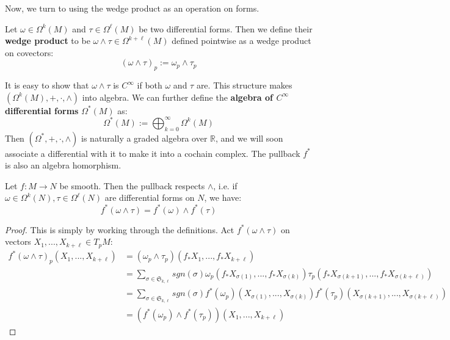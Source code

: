 Now, we turn to using the wedge product as an operation on forms. 
\begin{definition}
	Let $\omega\in\Omega^k(M)$ and $\tau\in\Omega^\ell(M)$ be two differential forms. Then we define their \textbf{wedge 
	product} to be $\omega\wedge\tau\in\Omega^{k + \ell}(M)$ defined pointwise as a wedge product on covectors:
	\begin{equation}
		(\omega\wedge\tau)_p :=\omega_p\wedge\tau_p
	\end{equation}
\end{definition}
It is easy to show that $\omega\wedge\tau$ is $C^\infty$ if both $\omega$ and $\tau$ are. This structure makes 
$(\Omega^k(M), +, \cdot, \wedge)$ into algebra. We can further define the \textbf{algebra of $C^\infty$ differential forms} 
$\Omega^*(M)$ as:
\begin{equation}
	\Omega^*(M) := \bigoplus_{k = 0}^\infty\Omega^k(M)
\end{equation}
Then $(\Omega^*, +, \cdot, \wedge)$ is naturally a graded algebra over $\mathbb R$, and we will soon associate a differential 
with it to make it into a cochain complex. The pullback $f^*$ is also an algebra homorphism.
\begin{theorem}
	Let $f : M\rightarrow N$ be smooth. Then the pullback respects $\wedge$, i.e. if $\omega\in\Omega^k(N), 
	\tau\in\Omega^\ell(N)$ are differential forms on $N$, we have:
	\begin{equation}
		f^*(\omega\wedge\tau) = f^*(\omega)\wedge f^*(\tau)
	\end{equation}
\end{theorem}
\begin{proof}
	This is simply by working through the definitions. Act $f^*(\omega\wedge\tau)$ on vectors $X_1, ..., X_{k + \ell}\in T_p M$:
	\begin{align}
		f^*(\omega\wedge\tau)_p(X_1, ..., X_{k + \ell}) &= (\omega_p\wedge\tau_p)(f_* X_1, ..., f_* X_{k + \ell})\\
		&= \sum_{\sigma\in\mathfrak S_{k, \ell}}sgn(\sigma) \omega_p(f_* X_{\sigma(1)}, ..., f_* X_{\sigma(k)})
		\tau_p(f_* X_{\sigma(k + 1)}, ..., f_* X_{\sigma(k + \ell)}) \\
		&= \sum_{\sigma\in\mathfrak S_{k, \ell}}sgn(\sigma) f^*(\omega_p)(X_{\sigma(1)}, ..., X_{\sigma(k)})f^*(\tau_p)
		(X_{\sigma(k + 1)}, ..., X_{\sigma(k + \ell)}) \\
		&= (f^*(\omega_p)\wedge f^*(\tau_p))(X_1, ..., X_{k + \ell})
	\end{align}
\end{proof}

